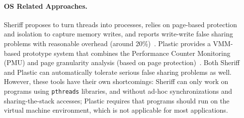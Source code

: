 
\paragraph{OS Related Approaches.} Sheriff proposes to turn threads into processes, relies on page-based protection and isolation to capture memory writes, and reports write-write false sharing problems with reasonable overhead (around 20\%)~\cite{Sheriff}. Plastic provides a VMM-based prototype system that combines the Performance Counter Monitoring (PMU) and page granularity analysis (based on page protection)~\cite{OSdetection}. Both Sheriff and Plastic can automatically tolerate serious false sharing problems as well. However, these tools have their own shortcomings: Sheriff can only work on programs using \texttt{pthreads} libraries, and without ad-hoc synchronizations and sharing-the-stack accesses; Plastic requires that programs should run on the virtual machine environment, which is not applicable for most applications.   

